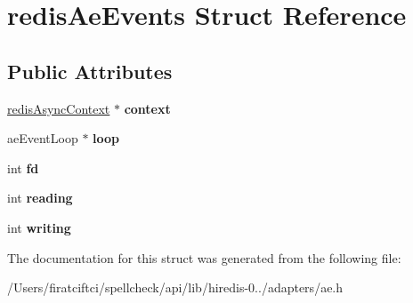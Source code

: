 \hypertarget{structredis_ae_events}{}\section{redis\+Ae\+Events Struct Reference}
\label{structredis_ae_events}
\subsection*{Public Attributes}
\begin{DoxyCompactItemize}
\item 
\mbox{\label{structredis_ae_events_a8ccdd28fe44a7c4e376a8c8f7cbc0954}} 
\mbox{\hyperlink{structredis_async_context}{redis\+Async\+Context}} $\ast$ {\bfseries context}
\item 
\mbox{\label{structredis_ae_events_abbbedca4a9f5df8e17b39e4bdea83773}} 
ae\+Event\+Loop $\ast$ {\bfseries loop}
\item 
\mbox{\label{structredis_ae_events_a0223bf4ebfbf5d32886e06147ea30df1}} 
int {\bfseries fd}
\item 
\mbox{\label{structredis_ae_events_abf97765c389403e1c0ee36ac60cd38a5}} 
int {\bfseries reading}
\item 
\mbox{\label{structredis_ae_events_aef1285c4c876d3c7f4616830d5fc9d3e}} 
int {\bfseries writing}
\end{DoxyCompactItemize}


The documentation for this struct was generated from the following file\+:\begin{DoxyCompactItemize}
\item 
/\+Users/firatciftci/spellcheck/api/lib/hiredis-\/0../adapters/ae.\+h\end{DoxyCompactItemize}
